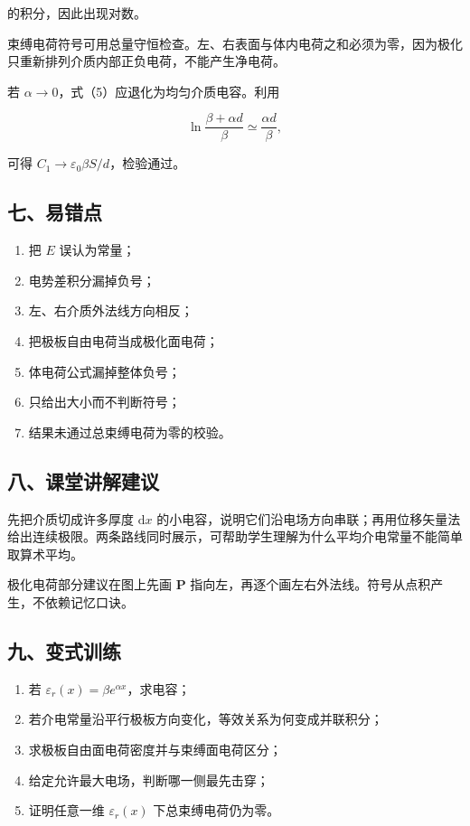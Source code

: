 \documentclass[12pt,a4paper,UTF8]{ctexart}
\newcommand{\tightlist}{\setlength{\itemsep}{0pt}\setlength{\parskip}{0pt}}
\begin{document}
的积分，因此出现对数。

束缚电荷符号可用总量守恒检查。左、右表面与体内电荷之和必须为零，因为极化只重新排列介质内部正负电荷，不能产生净电荷。

若 \(\alpha\to0\)，式（5）应退化为均匀介质电容。利用

\[
\ln\frac{\beta+\alpha d}{\beta}
\simeq\frac{\alpha d}{\beta},
\]

可得 \(C_1\to\varepsilon_0\beta S/d\)，检验通过。

\subsection{七、易错点}\label{ux4e03ux6613ux9519ux70b9-1}

\begin{enumerate}
\def\labelenumi{\arabic{enumi}.}
\tightlist
\item
  把 \(E\) 误认为常量；
\item
  电势差积分漏掉负号；
\item
  左、右介质外法线方向相反；
\item
  把极板自由电荷当成极化面电荷；
\item
  体电荷公式漏掉整体负号；
\item
  只给出大小而不判断符号；
\item
  结果未通过总束缚电荷为零的校验。
\end{enumerate}

\subsection{八、课堂讲解建议}\label{ux516bux8bfeux5802ux8bb2ux89e3ux5efaux8bae-1}

先把介质切成许多厚度 \(\mathrm dx\)
的小电容，说明它们沿电场方向串联；再用位移矢量法给出连续极限。两条路线同时展示，可帮助学生理解为什么平均介电常量不能简单取算术平均。

极化电荷部分建议在图上先画 \(\bm P\)
指向左，再逐个画左右外法线。符号从点积产生，不依赖记忆口诀。

\subsection{九、变式训练}\label{ux4e5dux53d8ux5f0fux8badux7ec3-1}

\begin{enumerate}
\def\labelenumi{\arabic{enumi}.}
\tightlist
\item
  若 \(\varepsilon_r(x)=\beta e^{\alpha x}\)，求电容；
\item
  若介电常量沿平行极板方向变化，等效关系为何变成并联积分；
\item
  求极板自由面电荷密度并与束缚面电荷区分；
\item
  给定允许最大电场，判断哪一侧最先击穿；
\item
  证明任意一维 \(\varepsilon_r(x)\) 下总束缚电荷仍为零。
\end{enumerate}
\end{document}
